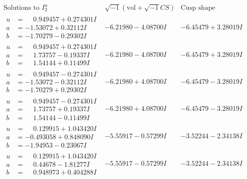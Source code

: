 \documentclass[1p]{elsarticle_modified}
\theoremstyle{definition}
\newcommand{\I}{\sqrt{-1}}
\begin{document}
$$\begin{array}{c|c|c}  
\text{Solutions to }I^u_{2}& \I (\text{vol} + \sqrt{-1}CS) & \text{Cusp shape}\\
 \hline 
\begin{aligned}
u &= \phantom{-}0.949457 + 0.274301 I \\
a &= -1.53072 + 0.32112 I \\
b &= -1.70279 - 0.29302 I\end{aligned}
 & -6.21980 - 4.08700 I & -6.45479 + 3.28019 I \\ \hline\begin{aligned}
u &= \phantom{-}0.949457 + 0.274301 I \\
a &= \phantom{-}1.73757 - 0.19337 I \\
b &= \phantom{-}1.54144 + 0.11499 I\end{aligned}
 & -6.21980 - 4.08700 I & -6.45479 + 3.28019 I \\ \hline\begin{aligned}
u &= \phantom{-}0.949457 - 0.274301 I \\
a &= -1.53072 - 0.32112 I \\
b &= -1.70279 + 0.29302 I\end{aligned}
 & -6.21980 + 4.08700 I & -6.45479 - 3.28019 I \\ \hline\begin{aligned}
u &= \phantom{-}0.949457 - 0.274301 I \\
a &= \phantom{-}1.73757 + 0.19337 I \\
b &= \phantom{-}1.54144 - 0.11499 I\end{aligned}
 & -6.21980 + 4.08700 I & -6.45479 - 3.28019 I \\ \hline\begin{aligned}
u &= \phantom{-}0.129915 + 1.043420 I \\
a &= -0.493058 + 0.848090 I \\
b &= -1.94953 - 0.23067 I\end{aligned}
 & -5.55917 - 0.57299 I & -3.52244 - 2.34138 I \\ \hline\begin{aligned}
u &= \phantom{-}0.129915 + 1.043420 I \\
a &= \phantom{-}0.44678 - 1.81277 I \\
b &= \phantom{-}0.948973 + 0.404288 I\end{aligned}
 & -5.55917 - 0.57299 I & -3.52244 - 2.34138 I \\ \hline\begin{aligned}

\end{aligned}
\end{array}$$
\end{document}
